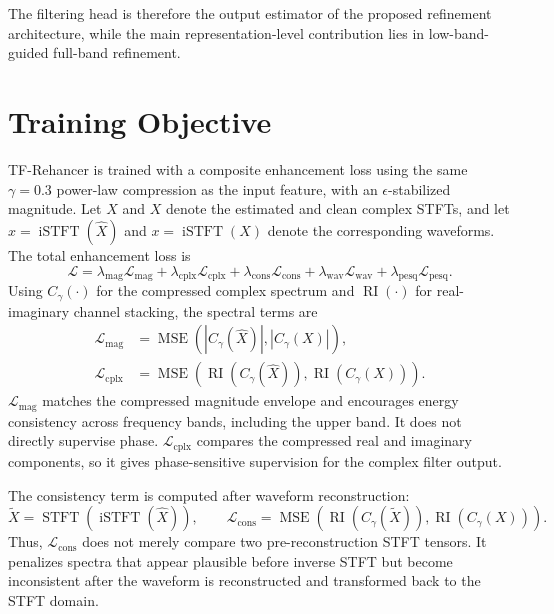 The filtering head is therefore the output estimator of the proposed refinement architecture, while the main representation-level contribution lies in low-band-guided full-band refinement.

\section{Training Objective}
\label{sec:method_training}

TF-Rehancer is trained with a composite enhancement loss using the same \(\gamma=0.3\) power-law compression as the input feature, with an \(\epsilon\)-stabilized magnitude. Let \(\hat{X}\) and \(X\) denote the estimated and clean complex STFTs, and let \(\hat{x}=\operatorname{iSTFT}(\hat{X})\) and \(x=\operatorname{iSTFT}(X)\) denote the corresponding waveforms. The total enhancement loss is
\begin{equation}
    \mathcal{L}
    =
    \lambda_{\mathrm{mag}}\mathcal{L}_{\mathrm{mag}}
    +
    \lambda_{\mathrm{cplx}}\mathcal{L}_{\mathrm{cplx}}
    +
    \lambda_{\mathrm{cons}}\mathcal{L}_{\mathrm{cons}}
    +
    \lambda_{\mathrm{wav}}\mathcal{L}_{\mathrm{wav}}
    +
    \lambda_{\mathrm{pesq}}\mathcal{L}_{\mathrm{pesq}}.
\end{equation}
Using \(C_\gamma(\cdot)\) for the compressed complex spectrum and \(\operatorname{RI}(\cdot)\) for real-imaginary channel stacking, the spectral terms are
\begin{align}
    \mathcal{L}_{\mathrm{mag}}
    &=
    \operatorname{MSE}
    \left(
    |C_\gamma(\hat{X})|,
    |C_\gamma(X)|
    \right),
    \\
    \mathcal{L}_{\mathrm{cplx}}
    &=
    \operatorname{MSE}
    \left(
    \operatorname{RI}(C_\gamma(\hat{X})),
    \operatorname{RI}(C_\gamma(X))
    \right).
\end{align}
\(\mathcal{L}_{\mathrm{mag}}\) matches the compressed magnitude envelope and encourages energy consistency across frequency bands, including the upper band. It does not directly supervise phase. \(\mathcal{L}_{\mathrm{cplx}}\) compares the compressed real and imaginary components, so it gives phase-sensitive supervision for the complex filter output.

The consistency term is computed after waveform reconstruction:
\begin{equation}
    \tilde{X}
    =
    \operatorname{STFT}
    \left(
    \operatorname{iSTFT}(\hat{X})
    \right),
    \qquad
    \mathcal{L}_{\mathrm{cons}}
    =
    \operatorname{MSE}
    \left(
    \operatorname{RI}(C_\gamma(\tilde{X})),
    \operatorname{RI}(C_\gamma(X))
    \right).
\end{equation}
Thus, \(\mathcal{L}_{\mathrm{cons}}\) does not merely compare two pre-reconstruction STFT tensors. It penalizes spectra that appear plausible before inverse STFT but become inconsistent after the waveform is reconstructed and transformed back to the STFT domain.

